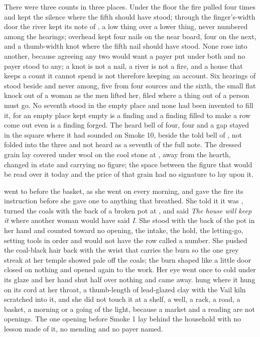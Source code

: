 There were three counts in three places. Under the floor the fire pulled four times and kept the silence where the fifth should have stood; through the finger's-width door the river kept its note of , a low thing over a lower thing, never numbered among the hearings; overhead  kept four nails on the near board, four on the next, and a thumb-width knot where the fifth nail should have stood. None rose into another, because agreeing any two would want a payer put under both and no payer stood to any; a knot is not a nail, a river is not a fire, and a house that keeps a count it cannot spend is not therefore keeping an account. Six hearings of  stood beside and never among, five from four sources and the sixth, the small flat knock out of a woman as the men lifted her, filed where a thing out of a person must go. No seventh stood in the empty place and none had been invented to fill it, for an empty place kept empty is a finding and a finding filled to make a row come out even is a finding forged. The heard bell of four, four and a gap stayed in the square where it had sounded on Smoke 10, beside the told bell of , not folded into the three and not heard as a seventh of the full note. The dressed grain lay covered under wool on the cool stone at , away from the hearth, changed in state and carrying no figure; the space between the figure that would be read over it today and the price of that grain had no signature to lay upon it.

 went to  before the basket, as she went on every morning, and gave the fire its instruction before she gave one to anything that breathed. She told it it was , turned the coals with the back of a broken pot at , and said \emph{The house will keep it} where another woman would have said \emph{I}. She stood with the back of the pot in her hand and counted toward no opening, the intake, the hold, the letting-go, setting tools in order and would not have the row called a number. She pushed the coal-black hair back with the wrist that carries the burn so the one grey streak at her temple showed pale off the coals; the burn shaped like a little door closed on nothing and opened again to the work. Her eye went once to  cold under its glaze and her hand shut half over nothing and came away.  hung where it hung on its cord at her throat, a thumb-length of lead-glazed clay with the Vail kiln scratched into it, and she did not touch it at a shelf, a well, a rack, a road, a basket, a morning or a going of the light, because a market and a reading are not openings. The one opening before Smoke 1 lay behind the household with no lesson made of it, no mending and no payer named.

